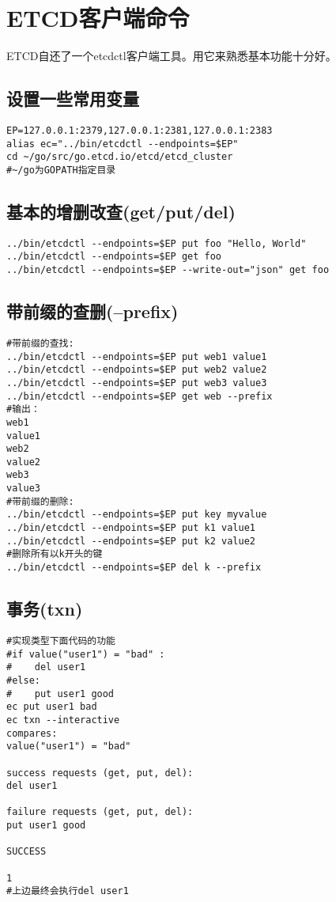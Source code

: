 \section{ETCD客户端命令}
ETCD自还了一个etcdctl客户端工具。用它来熟悉基本功能十分好。
\subsection{设置一些常用变量}
\begin{verbatim}
EP=127.0.0.1:2379,127.0.0.1:2381,127.0.0.1:2383
alias ec="../bin/etcdctl --endpoints=$EP"
cd ~/go/src/go.etcd.io/etcd/etcd_cluster
#~/go为GOPATH指定目录
\end{verbatim}

\subsection{基本的增删改查(get/put/del)}
\begin{verbatim}
../bin/etcdctl --endpoints=$EP put foo "Hello, World"
../bin/etcdctl --endpoints=$EP get foo
../bin/etcdctl --endpoints=$EP --write-out="json" get foo
\end{verbatim}

\subsection{带前缀的查删(--prefix)}
\begin{verbatim}
#带前缀的查找:
../bin/etcdctl --endpoints=$EP put web1 value1
../bin/etcdctl --endpoints=$EP put web2 value2
../bin/etcdctl --endpoints=$EP put web3 value3
../bin/etcdctl --endpoints=$EP get web --prefix
#输出：
web1
value1
web2
value2
web3
value3
#带前缀的删除:
../bin/etcdctl --endpoints=$EP put key myvalue
../bin/etcdctl --endpoints=$EP put k1 value1
../bin/etcdctl --endpoints=$EP put k2 value2
#删除所有以k开头的键
../bin/etcdctl --endpoints=$EP del k --prefix
\end{verbatim}

\subsection{事务(txn)}
\begin{verbatim}
#实现类型下面代码的功能
#if value("user1") = "bad" :
#    del user1
#else:
#    put user1 good
ec put user1 bad
ec txn --interactive
compares:
value("user1") = "bad"

success requests (get, put, del):
del user1

failure requests (get, put, del):
put user1 good

SUCCESS

1
#上边最终会执行del user1
\end{verbatim}

